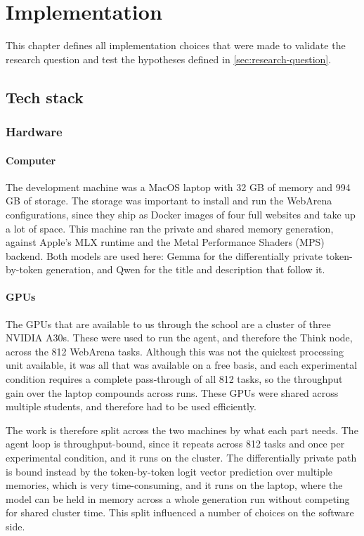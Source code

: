 \chapter{Implementation}\label{ch:implementation}

This chapter defines all implementation choices that were made to validate the research question and test the hypotheses defined in \ref{sec:research-question}.

\section{Tech stack}\label{sec:tech-stack}
\subsection{Hardware}
\subsubsection{Computer}
The development machine was a MacOS laptop with 32 GB of memory and 994 GB of storage. The storage was important to install and run the WebArena configurations, since they ship as Docker images of four full websites and take up a lot of space. This machine ran the private and shared memory generation, against Apple's MLX runtime and the Metal Performance Shaders (MPS) backend. Both models are used here: Gemma for the differentially private token-by-token generation, and Qwen for the title and description that follow it.

\subsubsection{GPUs}
The GPUs that are available to us through the school are a cluster of three NVIDIA A30s. These were used to run the agent, and therefore the Think node, across the 812 WebArena tasks. Although this was not the quickest processing unit available, it was all that was available on a free basis, and each experimental condition requires a complete pass-through of all 812 tasks, so the throughput gain over the laptop compounds across runs. These GPUs were shared across multiple students, and therefore had to be used efficiently.

The work is therefore split across the two machines by what each part needs. The agent loop is throughput-bound, since it repeats across 812 tasks and once per experimental condition, and it runs on the cluster. The differentially private path is bound instead by the token-by-token logit vector prediction over multiple memories, which is very time-consuming, and it runs on the laptop, where the model can be held in memory across a whole generation run without competing for shared cluster time. This split influenced a number of choices on the software side.


